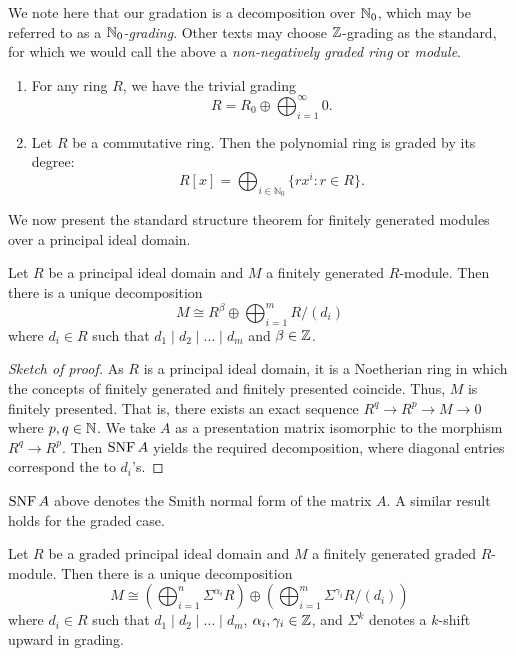We note here that our gradation is a decomposition over $\mathbb N_0$, which may be referred to as a \emph{$\mathbb N_0$-grading}. Other texts may choose $\mathbb Z$-grading as the standard, for which we would call the above a \emph{non-negatively graded ring} or \emph{module}.

\begin{example} \hspace{0em}
    \begin{enumerate}
        \item For any ring $R$, we have the trivial grading \[R = R_0 \oplus \bigoplus_{i=1}^\infty 0.\]
        \item Let $R$ be a commutative ring. Then the polynomial ring is graded by its degree:
              \[ R[x] = \bigoplus_{i \in \mathbb N_0} \{rx^i: r \in R\}. \]
    \end{enumerate}
\end{example}

We now present the standard structure theorem for finitely generated modules over a principal ideal domain.

\begin{theorem} \label{the:module-over-pid-structure}
    Let $R$ be a principal ideal domain and $M$ a finitely generated $R$-module. Then there is a unique decomposition
    \begin{equation} \label{eq:module-over-pid-structure}
        M \cong R^\beta \oplus \bigoplus_{i=1}^m R/(d_i)
    \end{equation}
    where $d_i \in R$ such that $d_1 \mid d_2 \mid \ldots \mid d_m$ and $\beta \in \mathbb Z$.
\end{theorem}

\begin{proof}[Sketch of proof]
    As $R$ is a principal ideal domain, it is a Noetherian ring in which the concepts of finitely generated and finitely presented coincide. Thus, $M$ is finitely presented. That is, there exists an exact sequence $R^q \to R^p \to M \to 0$ where $p, q \in \mathbb N$. We take $A$ as a presentation matrix isomorphic to the morphism $R^q \to R^p$. Then $\operatorname{SNF} A$ yields the required decomposition, where diagonal entries correspond the to $d_i$'s.
\end{proof}

$\operatorname{SNF} A$ above denotes the Smith normal form of the matrix $A$. A similar result holds for the graded case.

\begin{theorem} \label{the:graded-module-over-pid-structure}
    Let $R$ be a graded principal ideal domain and $M$ a finitely generated graded $R$-module. Then there is a unique decomposition
    \begin{equation} \label{eq:graded-module-over-pid-structure}
        M \cong
        \left(\bigoplus_{i=1}^n \Sigma^{\alpha_i} R \right) \oplus
        \left(\bigoplus_{i=1}^m \Sigma^{\gamma_i} R/(d_i)\right)
    \end{equation}
    where $d_i \in R$ such that $d_1 \mid d_2 \mid \ldots \mid d_m$, $\alpha_i, \gamma_i \in \mathbb Z$, and $\Sigma^k$ denotes a $k$-shift upward in grading.
\end{theorem}

